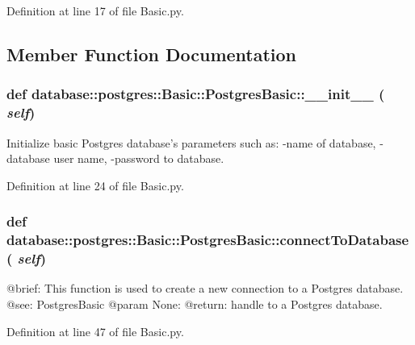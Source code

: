Definition at line 17 of file Basic.py.



\subsection{Member Function Documentation}
\hypertarget{classdatabase_1_1postgres_1_1Basic_1_1PostgresBasic_a0c63793aa57f84cc529cd81dd4f107f7}{
\subsubsection[{\_\-\_\-init\_\-\_\-}]{\setlength{\rightskip}{0pt plus 5cm}def database::postgres::Basic::PostgresBasic::\_\-\_\-init\_\-\_\- ( {\em self})}}
\label{classdatabase_1_1postgres_1_1Basic_1_1PostgresBasic_a0c63793aa57f84cc529cd81dd4f107f7}
\begin{DoxyVerb}
Initialize basic Postgres database's parameters such as:
-name of database,
-database user name,
-password to database.
\end{DoxyVerb}
 

Definition at line 24 of file Basic.py.

\hypertarget{classdatabase_1_1postgres_1_1Basic_1_1PostgresBasic_a5de8f4acfd24dccebf94a05d735bd397}{
\subsubsection[{connectToDatabase}]{\setlength{\rightskip}{0pt plus 5cm}def database::postgres::Basic::PostgresBasic::connectToDatabase ( {\em self})}}
\label{classdatabase_1_1postgres_1_1Basic_1_1PostgresBasic_a5de8f4acfd24dccebf94a05d735bd397}
\begin{DoxyVerb}
@brief: This function is used to create a new connection to a Postgres database.
@see: PostgresBasic
@param None:
@return: handle to a Postgres database. 
\end{DoxyVerb}
 

Definition at line 47 of file Basic.py.


